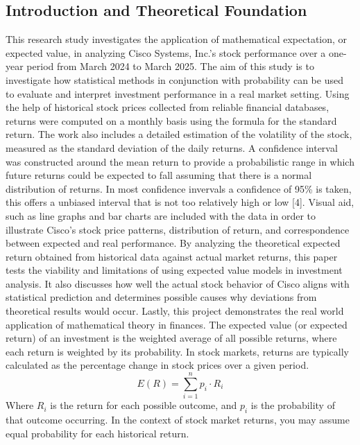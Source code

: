 \documentclass[12]{amsart}
\begin{document}
\begin{flushleft}
\section{ Introduction and Theoretical Foundation}
This research study investigates the application of mathematical expectation, or expected value, in analyzing Cisco Systems, Inc.'s stock performance over a one-year period from March 2024 to March 2025. The aim of this study is to investigate how statistical methods in conjunction with probability can be used to evaluate and interpret investment performance in a real market setting. Using the help of historical stock prices collected from reliable financial databases, returns were computed on a monthly basis using the formula for the standard return.
\newline
\newline
 The work also includes a detailed estimation of the volatility of the stock, measured as the standard deviation of the daily returns. A confidence interval was constructed around the mean return to provide a probabilistic range in which future returns could be expected to fall assuming that there is a normal distribution of returns. In most confidence invervals a confidence of 95\% is taken, this offers a unbiased interval that is not too relatively high or low [4]. Visual aid, such as line graphs and bar charts are included with the data in order to illustrate Cisco's stock price patterns, distribution of return, and correspondence between expected and real performance.
\newline
\newline
By analyzing the theoretical expected return obtained from historical data against actual market returns, this paper tests the viability and limitations of using expected value models in investment analysis. It also discusses how well the actual stock behavior of Cisco aligns with statistical prediction and determines possible causes why deviations from theoretical results would occur. Lastly, this project demonstrates the real world application of mathematical theory in finances.
\newline
\newline
The expected value (or expected return) of an investment is the weighted average of all possible returns, where each return is weighted by its probability. In stock markets, returns are typically calculated as the percentage change in stock prices over a given period.
\[
E(R) = \sum_{i=1}^{n} p_i \cdot R_i
\]
Where $R_i$ is the return for each possible outcome, and $p_i$ is the probability of that outcome occurring. In the context of stock market returns, you may assume equal probability for each historical return.



\end{flushleft}
\end{document}
